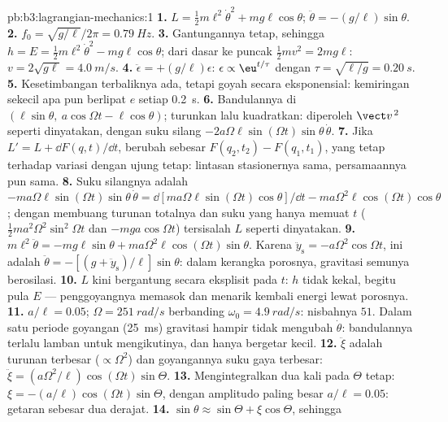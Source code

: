 \begin{solution}{pb:b3:lagrangian-mechanics:1}
\textbf{1.} $L = \tfrac12 m\ell^2\dot\theta^2 + mg\ell\cos\theta$;
$\ddot\theta = -(g/\ell)\sin\theta$.
\textbf{2.} $f_0 = \sqrt{g/\ell}/2\pi = \qty{0.79}{Hz}$.
\textbf{3.} Gantungannya tetap, sehingga $h = E = \tfrac12
m\ell^2\dot\theta^2 - mg\ell\cos\theta$; dari dasar ke puncak $\tfrac12
mv^2 = 2mg\ell$: $v = 2\sqrt{g\ell} = \qty{4.0}{m/s}$.
\textbf{4.} $\ddot\epsilon = +(g/\ell)\epsilon$: $\epsilon \propto
\eu^{t/\tau}$ dengan $\tau = \sqrt{\ell/g} = \qty{0.20}{s}$.
\textbf{5.} Kesetimbangan terbaliknya ada, tetapi goyah secara
eksponensial: kemiringan sekecil apa pun berlipat $e$ setiap
\qty{0.2}{s}.
\textbf{6.} Bandulannya di $(\ell\sin\theta,\ a\cos\Omega t - \ell\cos\theta)$;
turunkan lalu kuadratkan: diperoleh $\vect v^{\,2}$ seperti dinyatakan, dengan suku
silang $-2a\Omega\ell\sin(\Omega t)\sin\theta\,\dot\theta$.
\textbf{7.} Jika $L' = L + \dd F(q,t)/\dd t$,  berubah sebesar
$F(q_2, t_2) - F(q_1, t_1)$, yang tetap terhadap variasi dengan ujung
tetap: lintasan stasionernya sama, persamaannya pun sama.
\textbf{8.} Suku silangnya adalah $-ma\Omega\ell\sin(\Omega t)\sin\theta\,
\dot\theta = \dd[ma\Omega\ell\sin(\Omega t)\cos\theta]/\dd t -
ma\Omega^2\ell\cos(\Omega t)\cos\theta$; dengan membuang turunan totalnya
dan suku yang hanya memuat $t$ ($\tfrac12 ma^2\Omega^2\sin^2\Omega t$ dan
$-mga\cos\Omega t$) tersisalah $L$ seperti dinyatakan.
\textbf{9.} $m\ell^2\ddot\theta = -mg\ell\sin\theta +
ma\Omega^2\ell\cos(\Omega t)\sin\theta$. Karena $\ddot y_{\text{s}} =
-a\Omega^2\cos\Omega t$, ini adalah $\ddot\theta =
-[(g + \ddot y_{\text{s}})/\ell]\sin\theta$: dalam kerangka porosnya,
gravitasi semunya berosilasi.
\textbf{10.} $L$ kini bergantung secara eksplisit pada $t$: $h$ tidak
kekal, begitu pula $E$ --- penggoyangnya memasok dan menarik kembali
energi lewat porosnya.
\textbf{11.} $a/\ell = 0.05$; $\Omega = \qty{251}{rad/s}$ berbanding
$\omega_0 = \qty{4.9}{rad/s}$: nisbahnya $51$. Dalam satu periode goyangan
(\qty{25}{ms}) gravitasi hampir tidak mengubah $\dot\theta$: bandulannya
terlalu lamban untuk mengikutinya, dan hanya bergetar kecil.
\textbf{12.} $\ddot\xi$ adalah turunan terbesar ($\propto\Omega^2$)
dan goyangannya suku gaya terbesar: $\ddot\xi =
(a\Omega^2/\ell)\cos(\Omega t)\sin\Theta$.
\textbf{13.} Mengintegralkan dua kali pada $\Theta$ tetap: $\xi =
-(a/\ell)\cos(\Omega t)\sin\Theta$, dengan amplitudo paling besar $a/\ell =
0.05$: getaran sebesar dua derajat.
\textbf{14.} $\sin\theta \approx \sin\Theta + \xi\cos\Theta$, sehingga

\end{solution}
